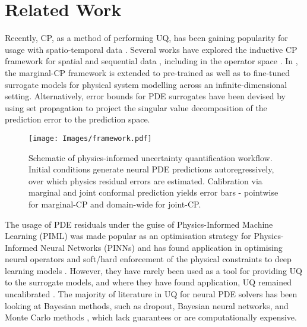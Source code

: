 \section{Related Work}
Recently, CP, as a method of performing UQ, has been gaining popularity for usage with spatio-temporal data \citet{sun2022conformal}. Several works have explored the inductive CP framework for spatial and sequential data \citep{conformaltimeserires,cp_dynamic_timeseries,CP_Wildfire}, including in the operator space \citep{ma2024calibrated}. In \citet{gopakumar2024uncertaintyquantificationsurrogatemodels}, the marginal-CP framework is extended to pre-trained as well as to fine-tuned surrogate models for physical system modelling across an infinite-dimensional setting. Alternatively, error bounds for PDE surrogates have been devised by \citet{gray2025guaranteedconfidencebandenclosurespde} using set propagation to project the singular value decomposition of the prediction error to the prediction space. 

\begin{figure}[h!]
    \centering
    \texttt{[image: Images/framework.pdf]}
    \caption{Schematic of physics-informed uncertainty quantification workflow. Initial conditions generate neural PDE predictions autoregressively, over which physics residual errors are estimated. Calibration via marginal and joint conformal prediction yields error bars - pointwise for marginal-CP and domain-wide for joint-CP.}
    \label{fig: layout}
\end{figure}


The usage of PDE residuals under the guise of Physics-Informed Machine Learning (PIML) \citep{PIML} was made popular as an optimisation strategy for Physics-Informed Neural Networks  (PINNs) \citep{Raissi2019PINNs} and has found application in optimising neural operators \citep{LiPino2024} and soft/hard enforcement of the physical constraints to deep learning models \citep{du2024neural,chalapathi2024scaling}. However, they have rarely been used as a tool for providing UQ to the surrogate models, and where they have found application, UQ remained uncalibrated \citep{ZhuPCDLUQ2019}. The majority of literature in UQ for neural PDE solvers has been looking at Bayesian methods, such as dropout, Bayesian neural networks, and Monte Carlo methods \citep{GENEVA2020109056, zou2022neuraluq, Psaros2023}, which lack guarantees or are computationally expensive.